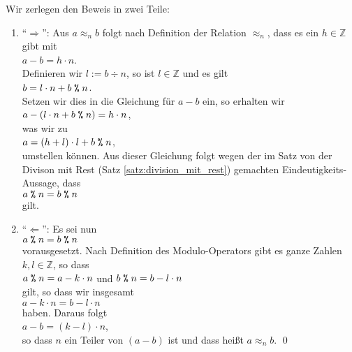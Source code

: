 \proof
Wir zerlegen den Beweis in zwei Teile:
\begin{enumerate}
\item ``$\Rightarrow$'':
      Aus $a \approx_n b$ folgt nach Definition der Relation $\approx_n$, dass es ein $h \in \mathbb{Z}$ gibt mit
      \\[0.2cm]
      \hspace*{1.3cm}
      $a - b = h \cdot n$.
      \\[0.2cm]
      Definieren wir $l := b \div n$, so ist $l \in \mathbb{Z}$ und es gilt
      \\[0.2cm]
      \hspace*{1.3cm}
      $b = l \cdot n + b \;\texttt{\%}\; n$.
      \\[0.2cm]
      Setzen wir dies in die Gleichung für $a - b$ ein, so erhalten wir
      \\[0.2cm]
      \hspace*{1.3cm}
      $a - (l \cdot n + b \;\texttt{\%}\; n) = h \cdot n$,
      \\[0.2cm]
      was wir zu
      \\[0.2cm]
      \hspace*{1.3cm}
      $a = (h + l) \cdot l + b \;\texttt{\%}\; n$,
      \\[0.2cm]
      umstellen können.  Aus dieser Gleichung folgt wegen der im Satz von der Divison mit Rest 
      (Satz \ref{satz:division_mit_rest})
      gemachten Eindeutigkeits-Aussage, dass
      \\[0.2cm]
      \hspace*{1.3cm}
      $a \;\texttt{\%}\; n = b \;\texttt{\%}\; n$
      \\[0.2cm]
      gilt. \checkmark
\item ``$\Leftarrow$'':
      Es sei nun 
      \\[0.2cm]
      \hspace*{1.3cm}
      $a \;\texttt{\%}\; n = b \;\texttt{\%}\; n$ 
      \\[0.2cm]
      vorausgesetzt. Nach Definition des Modulo-Operators gibt es ganze Zahlen $k,l \in
      \mathbb{Z}$, so dass 
      \\[0.2cm]
      \hspace*{1.3cm}
      $a \;\texttt{\%}\; n = a - k \cdot n$ \quad und \quad
      $b \;\texttt{\%}\; n = b - l \cdot n$ 
      \\[0.2cm]
      gilt, so dass wir insgesamt
      \\[0.2cm]
      \hspace*{1.3cm}
      $a - k \cdot n = b - l \cdot n$
      \\[0.2cm]
      haben.   Daraus folgt
      \\[0.2cm]
      \hspace*{1.3cm}
      $a - b = (k - l) \cdot n$,
      \\[0.2cm]
      so dass $n$ ein Teiler von $(a- b)$ ist und dass heißt $a \approx_n b$. \checkmark \qed
\end{enumerate}

